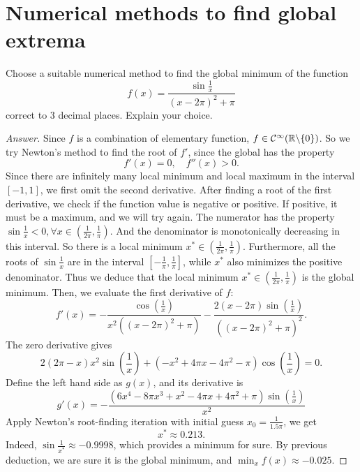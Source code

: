 \section{Numerical methods to find global extrema}
Choose a suitable numerical method to find the global minimum of the function
\[ f(x)=\frac{\sin\frac{1}{x}}{(x-2\pi)^2+\pi} \]
correct to 3 decimal places.
Explain your choice.
\begin{proof}[Answer]
	Since \(f\) is a combination of elementary function, \(f\in\mathcal{C}^\infty(\mathbb{R}\backslash\{0\})\).
	So we try Newton's method to find the root of \(f'\), since the global has the property
	\[ f'(x)=0, \quad f''(x)>0. \]
	Since there are infinitely many local minimum and local maximum in the interval \([-1,1]\), we first omit the second derivative.
	After finding a root of the first derivative, we check if the function value is negative or positive.
	If positive, it must be a maximum, and we will try again.
	The numerator has the property \(\sin\frac{1}{x}<0,\forall x\in\left(\frac{1}{2\pi},\frac{1}{\pi}\right)\).
	And the denominator is monotonically decreasing in this interval.
	So there is a local minimum \(x^*\in\left(\frac{1}{2\pi},\frac{1}{\pi}\right)\).
	Furthermore, all the roots of \(\sin\frac{1}{x}\) are in the interval \(\left[-\frac{1}{\pi},\frac{1}{\pi}\right]\), while \(x^*\) also minimizes the positive denominator.
	Thus we deduce that the local minimum \(x^*\in\left(\frac{1}{2\pi},\frac{1}{\pi}\right)\) is the global minimum.
	Then, we evaluate the first derivative of \(f\):
	\[	f'(x)=	-\frac{\cos \left(\frac{1}{x}\right)}{x^2 \left((x-2 \pi )^2+\pi \right)}-\frac{2 (x-2 \pi ) \sin \left(\frac{1}{x}\right)}{\left((x-2 \pi )^2+\pi \right)^2}.	\]
	The zero derivative gives
	\[ 2 (2 \pi -x) x^2 \sin \left(\frac{1}{x}\right)+\left(-x^2+4 \pi  x-4 \pi ^2-\pi \right) \cos \left(\frac{1}{x}\right)=0. \]
	Define the left hand side as \(g(x)\), and its derivative is
	\[ g'(x)=-\frac{\left(6 x^4-8 \pi  x^3+x^2-4 \pi  x+4 \pi ^2+\pi \right) \sin \left(\frac{1}{x}\right)}{x^2} \]
	Apply Newton's root-finding iteration with initial guess
	\(x_0=\frac{1}{1.5\pi}\), we get
	\[ x^*\approx0.213. \]
	Indeed, \(\sin\frac{1}{x^*}\approx-0.9998\), which provides a minimum for sure.
	By previous deduction, we are sure it is the global minimum, and \(\min_x f(x)\approx-0.025\).
\end{proof}


